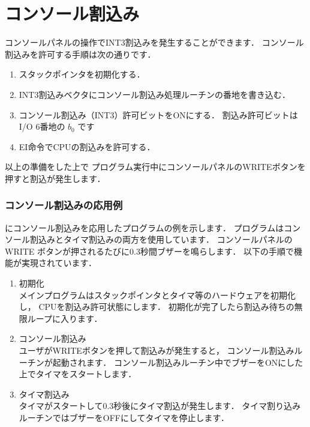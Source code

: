 \newpage
\section{コンソール割込み}

コンソールパネルの操作でINT3割込みを発生することができます．
コンソール割込みを許可する手順は次の通りです．

\begin{enumerate}
\item スタックポインタを初期化する．

\item INT3割込みベクタにコンソール割込み処理ルーチンの番地を書き込む．

\item コンソール割込み（INT3）許可ビットをONにする．
割込み許可ビットはI/O 6番地の $b_0$ です

\begin{center}
\end{center}

\item EI命令でCPUの割込みを許可する．
\end{enumerate}

以上の準備をした上で
プログラム実行中にコンソールパネルのWRITEボタンを押すと割込が発生します．

\subsubsection{コンソール割込みの応用例}

にコンソール割込みを応用したプログラムの例を示します．
プログラムはコンソール割込みとタイマ割込みの両方を使用しています．
コンソールパネルの WRITE ボタンが押されるたびに0.3秒間ブザーを鳴らします．
以下の手順で機能が実現されています．

\begin{enumerate}
\item 初期化 \\
メインプログラムはスタックポインタとタイマ等のハードウェアを初期化し，
CPUを割込み許可状態にします．
初期化が完了したら割込み待ちの無限ループに入ります．

\item コンソール割込み \\
ユーザがWRITEボタンを押して割込みが発生すると，
コンソール割込みルーチンが起動されます．
コンソール割込みルーチン中でブザーをONにした上でタイマをスタートします．

\item タイマ割込み \\
タイマがスタートして0.3秒後にタイマ割込が発生します．
タイマ割り込みルーチンではブザーをOFFにしてタイマを停止します．

\end{enumerate}

